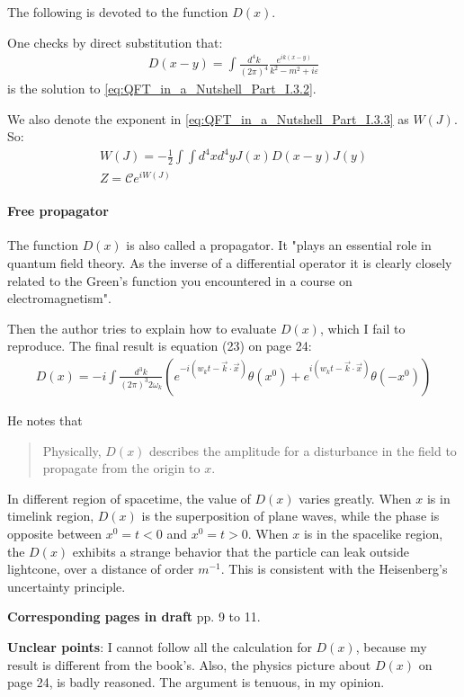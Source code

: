 \documentclass{book}
\numberwithin{equation}{subsection} %
\theoremstyle{definition}
\begin{document}
The following is devoted to the function $D(x)$.

One checks by direct substitution that:
\begin{align}
    D(x-y) = \int \frac{d^4k}{(2\pi)^4} 
        \frac{e^{ik(x-y)}}{k^2-m^2+i\varepsilon}
\end{align}
is the solution to \ref{eq:QFT_in_a_Nutshell_Part_I.3.2}.

We also denote the exponent in \ref{eq:QFT_in_a_Nutshell_Part_I.3.3}
as $W(J)$. So:
\begin{align}
    \label{eq:}
    W(J) = -\frac{1}{2} \int\int d^4x d^4y J(x)D(x-y)J(y) \\
    Z= \mathcal{C}e^{iW(J)}
\end{align}

\paragraph{Free propagator}

The function $D(x)$ is also called a propagator. It "plays an 
essential role in quantum field theory. As the inverse of a
differential operator it is clearly closely related to the Green’s
function you encountered in a course on electromagnetism".

Then the author tries to explain how to evaluate $D(x)$, which
I fail to reproduce. The final result is equation (23) on page 
24:
\begin{align}
    D(x)= -i\int \frac{d^3k}{(2\pi)^3 2\omega_k}
    \left( e^{-i(w_k t-\vec{k}\cdot\vec{x})} \theta(x^0)
        + e^{i(w_k t-\vec{k}\cdot\vec{x})} \theta(-x^0)
    \right)
\end{align}

He notes that
\begin{quote}
    Physically, $D(x)$ describes the amplitude for a disturbance 
    in the field to propagate from the origin to $x$. 
\end{quote}
In different region of spacetime, the value of $D(x)$ varies greatly.
When $x$ is in timelink region, $D(x)$ is the superposition of
plane waves, while the phase is opposite between $x^0=t<0$ and
$x^0=t>0$. When $x$ is in the spacelike region, the $D(x)$ exhibits
a strange behavior that the particle can leak outside lightcone,
over a distance of order $m^{-1}$. This is consistent with the
Heisenberg's uncertainty principle.

\textbf{Corresponding pages in draft} pp. 9 to 11.

\textbf{Unclear points}: I cannot follow all the calculation for 
$D(x)$, because my result is different from the book's. Also, the
physics picture about $D(x)$ on page 24, is badly reasoned. The
argument is tenuous, in my opinion.
\end{document}
